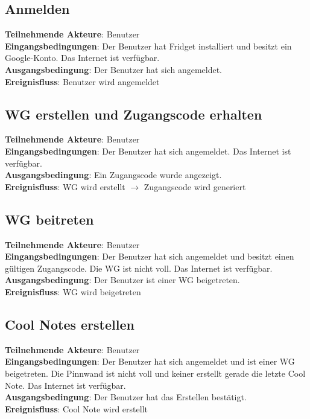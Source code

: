 \documentclass[a4paper]{scrreprt}
\begin{document}
        	\subsection{Anmelden}
        	\textbf{Teilnehmende Akteure}: Benutzer \\
        	\textbf{Eingangsbedingungen}: Der Benutzer hat Fridget installiert und besitzt ein Google-Konto. Das Internet ist verfügbar. \\
        	\textbf{Ausgangsbedingung}: Der Benutzer hat sich angemeldet. \\
        	\textbf{Ereignisfluss}: Benutzer wird angemeldet
        	
        	\subsection{WG erstellen und Zugangscode erhalten}
        	\textbf{Teilnehmende Akteure}: Benutzer \\
        	\textbf{Eingangsbedingungen}: Der Benutzer hat sich angemeldet. Das Internet ist verfügbar. \\
        	\textbf{Ausgangsbedingung}: Ein Zugangscode wurde angezeigt. \\
        	\textbf{Ereignisfluss}: WG wird erstellt $\rightarrow$ Zugangscode wird generiert
        	
        	\subsection{WG beitreten}
        	\textbf{Teilnehmende Akteure}: Benutzer \\
        	\textbf{Eingangsbedingungen}: Der Benutzer hat sich angemeldet und besitzt einen gültigen Zugangscode. Die WG ist nicht voll. Das Internet ist verfügbar. \\
        	\textbf{Ausgangsbedingung}: Der Benutzer ist einer WG beigetreten. \\
        	\textbf{Ereignisfluss}: WG wird beigetreten
        	
        	\subsection{Cool Notes erstellen}
        	\textbf{Teilnehmende Akteure}: Benutzer \\
        	\textbf{Eingangsbedingungen}: Der Benutzer hat sich angemeldet und ist einer WG beigetreten. Die Pinnwand ist nicht voll und keiner erstellt gerade die letzte Cool Note. Das Internet ist verfügbar. \\
        	\textbf{Ausgangsbedingung}: Der Benutzer hat das Erstellen bestätigt. \\
        	\textbf{Ereignisfluss}: Cool Note wird erstellt
        	
\end{document}
